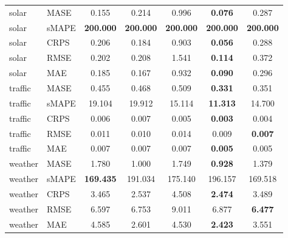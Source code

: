 \begin{table}[t]
\begin{tabular}{llccccc}
solar & MASE & 0.155 & 0.214 & 0.996 & \textbf{0.076} & 0.287 \\
solar & sMAPE & \textbf{200.000} & \textbf{200.000} & \textbf{200.000} & \textbf{200.000} & \textbf{200.000} \\
solar & CRPS & 0.206 & 0.184 & 0.903 & \textbf{0.056} & 0.288 \\
solar & RMSE & 0.202 & 0.208 & 1.541 & \textbf{0.114} & 0.372 \\
solar & MAE & 0.185 & 0.167 & 0.932 & \textbf{0.090} & 0.296 \\
traffic & MASE & 0.455 & 0.468 & 0.509 & \textbf{0.331} & 0.351 \\
traffic & sMAPE & 19.104 & 19.912 & 15.114 & \textbf{11.313} & 14.700 \\
traffic & CRPS & 0.006 & 0.007 & 0.005 & \textbf{0.003} & 0.004 \\
traffic & RMSE & 0.011 & 0.010 & 0.014 & 0.009 & \textbf{0.007} \\
traffic & MAE & 0.007 & 0.007 & 0.007 & \textbf{0.005} & 0.005 \\
weather & MASE & 1.780 & 1.000 & 1.749 & \textbf{0.928} & 1.379 \\
weather & sMAPE & \textbf{169.435} & 191.034 & 175.140 & 196.157 & 169.518 \\
weather & CRPS & 3.465 & 2.537 & 4.508 & \textbf{2.474} & 3.489 \\
weather & RMSE & 6.597 & 6.753 & 9.011 & 6.877 & \textbf{6.477} \\
weather & MAE & 4.585 & 2.601 & 4.530 & \textbf{2.423} & 3.551 \\
\bottomrule
\end{tabular}
\end{table}